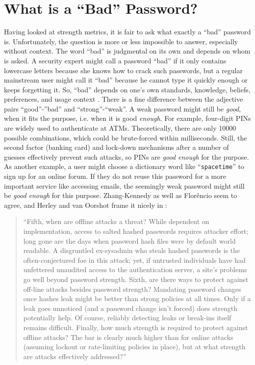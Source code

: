 \section{What is a ``Bad'' Password?}\label{sec:rw:whats_a_bad_pw}
Having looked at strength metrics, it is fair to ask what exactly a ``bad'' password is. Unfortunately, the question is more or less impossible to answer, especially without context. The word ``bad'' is judgmental on its own and depends on whom is asked. A security expert might call a password ``bad'' if it only contains lowercase letters because she knows how to crack such passwords, but a regular mainstream user might call it ``bad'' because he cannot type it quickly enough or keeps forgetting it. So, ``bad'' depends on one's own standards, knowledge, beliefs, preferences, and usage context \cite{Gaw2005ReuseRecycle, Haque2014Hierarchy}. There is a fine difference between the adjective pairs ``good''-''bad'' and ``strong''-``weak''. A weak password might still be \textit{good}, when it fits the purpose, i.e. when it is good \textit{enough}. For example, four-digit PINs are widely used to authenticate at ATMs. Theoretically, there are only 10000 possible combinations, which could be brute-forced within milliseconds. Still, the second factor (banking card) and lock-down mechanisms after a number of guesses effectively prevent such attacks, so PINs are \textit{good enough} for the purpose. As another example, a user might choose a dictionary word like ``\texttt{spacetime}'' to sign up for an online forum. If they do not reuse this password for a more important service like accessing emails, the seemingly weak password might still be \textit{good enough} for this purpose. Zhang-Kennedy \etal \cite{ZhangKennedy2016RevisitingPasswordRules} as well as Florêncio \etal \cite{Florencio2007DoStrongWebPasswords, Florencio2014AdministratorsGuide, Florencio2014PasswordPortfoliosFiniteUser, Florencio2016CommACM} seem to agree, and Herley and van Oorshot frame it nicely in \cite{Herley2012PersistenceOfPasswords}:

\begin{quote}
	``Fifth, when are offline attacks a threat? While dependent on implementation, access to salted hashed passwords requires attacker effort; long gone are the days when password hash files were by default world readable. A disgruntled ex-sysadmin who steals hashed passwords is the often-conjectured foe in this attack; yet, if untrusted individuals have had unfettered unaudited access to the authentication server, a site’s problems go well beyond password strength. Sixth, are there ways to protect against off-line attacks besides password strength? Mandating password changes once hashes leak might be better than strong policies at all times. Only if a leak goes unnoticed (and a password change isn't forced) does strength potentially help. Of course, reliably detecting leaks or break-ins itself remains difficult. Finally, how much strength is required to protect against offline attacks? The bar is clearly much higher than for online attacks (assuming lockout or rate-limiting policies in place), but at what strength are attacks effectively addressed?'' 
\end{quote}

